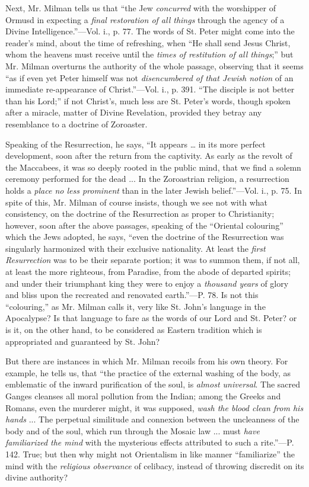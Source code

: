 Next, Mr. Milman tells us that ``the Jew \emph{concurred}
with the worshipper of Ormusd in expecting a \emph{final restoration of
all things} through the agency of a Divine Intelligence.''—Vol. i.,
p. 77. The words of St. Peter might come into the reader's mind, about
the time of refreshing, when ``He shall send Jesus Christ, whom the
heavens must receive until the \emph{times of restitution of all things};''
but Mr. Milman overturns the authority of the whole passage, observing
that it seems ``as if even yet Peter himself was not \emph{disencumbered
of that Jewish notion} of an immediate re-appearance of Christ.''—Vol.
i., p. 391. ``The disciple is not better than his Lord;'' if not Christ's,
much less are St. Peter's words, though spoken after a miracle, matter
of Divine Revelation, provided they betray any resemblance to a
doctrine of Zoroaster.

Speaking of the Resurrection, he says, ``It
appears … in its more perfect development, soon after the return
from the captivity. As early as the revolt of the Maccabees, it was so
deeply rooted in the public mind, that we find a solemn ceremony
performed for the dead ... In the Zoroastrian religion, a resurrection
holds a \emph{place no less prominent} than in the later Jewish
belief.''—Vol. i., p. 75. In spite of this, Mr. Milman of course
insists, though we see not with what consistency, on the doctrine of
the Resurrection as proper to Christianity; however, soon after the
above passages, speaking of the ``Oriental colouring'' which the Jews
adopted, he says, ``even the doctrine of the Resurrection was
singularly harmonized with their exclusive nationality. At least the \emph{first Resurrection} was to be their separate portion; it was
to summon them, if not all, at least the more righteous, from
Paradise, from the abode of departed spirits; and under their
triumphant king they were to enjoy a \emph{thousand years} of glory
and bliss upon the recreated and renovated earth.''—P. 78. Is not
this ``colouring,'' as Mr. Milman calls it, very like St. John's
language in the Apocalypse? Is that language to fare as the words of
our Lord and St. Peter? or is it, on the other hand, to be considered
as Eastern tradition which is appropriated and guaranteed by St. John?

But there are instances in which Mr. Milman
recoils from his own theory. For example, he tells us, that ``the
practice of the external washing of the body, as emblematic of the
inward purification of the soul, is \emph{almost universal}. The
sacred Ganges cleanses all moral pollution from the Indian; among the
Greeks and Romans, even the murderer might, it was supposed, \emph{wash
the blood clean from his hands} ... The perpetual similitude and
connexion between the uncleanness of the body and of the soul, which
run through the Mosaic law ... must \emph{have familiarized the mind}
with the mysterious effects attributed to such a rite.''—P. 142.
True; but then why might not Orientalism in like manner ``familiarize''
the mind with the \emph{religious observance} of celibacy, instead of
throwing discredit on its divine authority?


